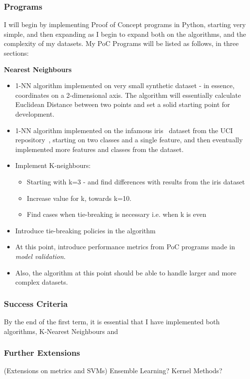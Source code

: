 \documentclass[report,10pt]{article}
\begin{document}
\subsubsection{Programs}
I will begin by implementing Proof of Concept programs in Python, starting very simple, and then expanding as I begin to expand both on the algorithms, and the complexity of my datasets. My PoC Programs will be listed as follows, in three sections: \par
\textbf{Nearest Neighbours}
\begin{itemize}
    \item 1-NN algorithm implemented on very small synthetic dataset - in essence, coordinates on a 2-dimensional axis. The algorithm will essentially calculate Euclidean Distance between two points and set a solid starting point for development.
    \item 1-NN algorithm implemented on the infamous iris~\cite{irisdata} dataset from the UCI repository~\cite{uci}, starting on two classes and a single feature, and then eventually implemented more features and classes from the dataset.
    \item Implement K-neighbours:
    \begin{itemize}
        \item Starting with k=3 - and find differences with results from the iris dataset
        \item Increase value for k, towards k=10. 
        \item Find cases when tie-breaking is necessary i.e. when k is even
    \end{itemize}
    \item Introduce tie-breaking policies in the algorithm
    \item At this point, introduce performance metrics from PoC programs made in \textit{model validation}.
    \item Also, the algorithm at this point should be able to handle larger and more complex datasets.
\end{itemize}

\subsubsection{Success Criteria}
By the end of the first term, it is essential that I have implemented both algorithms, K-Nearest Neighbours and 
\subsubsection{Further Extensions}
(Extensions on metrics and SVMs) Ensemble Learning? Kernel Methods?
\end{document}
